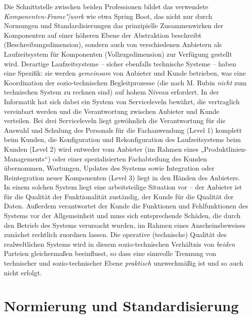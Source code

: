 \documentclass[11pt,a4paper]{article}
\begin{document}
Die Schnittstelle zwischen beiden Professionen bildet das verwendete
\emph{Komponenten-Frame"|work} wie etwa Spring Boot, das nicht nur durch
Normungen und Standardisierungen das prinzipielle Zusammenwirken der
Komponenten auf einer höheren Ebene der Abstraktion beschreibt
(Beschreibungsdimension), sondern auch von verschiedenen Anbietern als
Laufzeitsystem für Komponenten (Vollzugsdimension) zur Verfügung gestellt
wird. Derartige Laufzeitsysteme -- sicher ebenfalls technische Systeme --
haben eine Spezifik: sie werden \emph{gemeinsam} von Anbieter und Kunde
betrieben, was eine Koordination der sozio-technischen Begleitprozesse (die
nach M. Rubin \emph{nicht} zum technischen System zu rechnen sind) auf hohem
Niveau erfordert. In der Informatik hat sich dabei ein System von
Serviceleveln bewährt, die vertraglich vereinbart werden und die Verantwortung
zwischen Anbieter und Kunde verteilen. Bei drei Serviceleveln liegt gewöhnlich
die Verantwortung für die Auswahl und Schulung des Personals für die
Fachanwendung (Level 1) komplett beim Kunden, die Konfiguration und
Rekonfiguration des Laufzeitsystems beim Kunden (Level 2) wird entweder vom
Anbieter (im Rahmen eines „Produktlinien-Managements“) oder einer
spezialisierten Fachabteilung des Kunden übernommen, Wartungen, Updates des
Systems sowie Integration oder Reintegration neuer Komponenten (Level 3) liegt
in den Händen des Anbieters. In einem solchen System liegt eine arbeitsteilige
Situation vor -- der Anbieter ist für die Qualität der Funktionalität
zuständig, der Kunde für die Qualität der Daten. Außerdem verantwortet der
Kunde die Funktionen und Fehlfunktionen des Systems vor der Allgemeinheit und
muss sich entsprechende Schäden, die durch den Betrieb des Systems verursacht
wurden, im Rahmen eines Anscheinsbeweises zunächst rechtlich zuordnen lassen.
Die operative (technische) Qualität des realweltlichen Systems wird in diesem
sozio-technischen Verhältnis von \emph{beiden} Parteien gleichermaßen
beeinflusst, so dass eine sinnvolle Trennung von technischer und
sozio-technischer Ebene \emph{praktisch} unzweckmäßig ist und so auch nicht
erfolgt.

\section{Normierung und Standardisierung}
\end{document}
